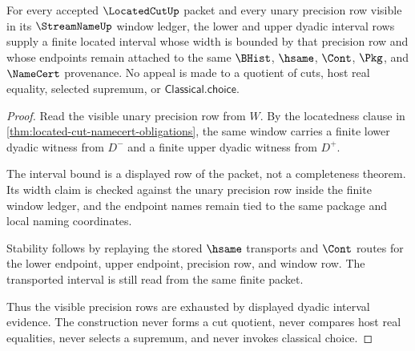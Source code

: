 \begin{theorem}
\label{thm:located-cut-dyadic-interval-exhaustion}
For every accepted $\LocatedCutUp$ packet and every unary precision row visible in its $\StreamNameUp$ window ledger, the lower and upper dyadic interval rows supply a finite located interval whose width is bounded by that precision row and whose endpoints remain attached to the same $\BHist$, $\hsame$, $\Cont$, $\Pkg$, and $\NameCert$ provenance. No appeal is made to a quotient of cuts, host real equality, selected supremum, or $\mathsf{Classical.choice}$.
\end{theorem}
\begin{proof}
Read the visible unary precision row from $W$. By the locatedness clause in \autoref{thm:located-cut-namecert-obligations}, the same window carries a finite lower dyadic witness from $D^{-}$ and a finite upper dyadic witness from $D^{+}$.

The interval bound is a displayed row of the packet, not a completeness theorem. Its width claim is checked against the unary precision row inside the finite window ledger, and the endpoint names remain tied to the same package and local naming coordinates.

Stability follows by replaying the stored $\hsame$ transports and $\Cont$ routes for the lower endpoint, upper endpoint, precision row, and window row. The transported interval is still read from the same finite packet.

Thus the visible precision rows are exhausted by displayed dyadic interval evidence. The construction never forms a cut quotient, never compares host real equalities, never selects a supremum, and never invokes classical choice.
\end{proof}

